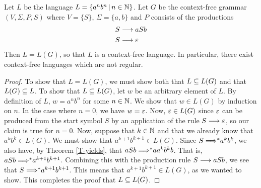 \begin{theorem}
Let $L$ be the language $L=\{a^nb^n\,|\, n\in{\mathbb N}\}$.  Let $G$ be
the context-free grammar $(V,\Sigma,P,S)$ where $V=\{S\}$,
$\Sigma=\{a,b\}$ and $P$ consists of the productions
\begin{align*}
     S&\longrightarrow aSb\\
     S&\longrightarrow \varepsilon 
\end{align*}
Then $L=L(G)$, so that $L$ is a context-free language.  In particular,
there exist context-free languages which are not regular.
\end{theorem}
\begin{proof}
To show that $L=L(G)$, we must show both that $L\subseteq L(G)$
and that $L(G)\subseteq L$.  To show that $L\subseteq L(G)$, let $w$
be an arbitrary element of $L$.  By definition of $L$,
$w=a^nb^n$ for some $n\in{\mathbb N}$.  We show that $w\in L(G)$ by
induction on $n$.  In the case where $n=0$, we have $w=\varepsilon$.
Now, $\varepsilon\in L(G)$ since $\varepsilon$ can be produced
from the start symbol $S$ by an application of the rule $S\longrightarrow\varepsilon$,
so our claim is true for $n=0$.
Now, suppose that $k\in{\mathbb N}$ and that we already know that $a^kb^k\in L(G)$.
We must show that $a^{k+1}b^{k+1}\in L(G)$.  Since 
$S\;{\Longrightarrow}^* a^kb^k$, we also have, by Theorem \ref{T-yields}, that
$aSb\;{\Longrightarrow}^* aa^kb^kb$.
That is, $aSb\;{\Longrightarrow}^* a^{k+1}b^{k+1}$.  Combining this with the
production rule $S\longrightarrow aSb$, we see that $S\;{\Longrightarrow}^* a^{k+1}b^{k+1}$.
This means that $a^{k+1}b^{k+1}\in L(G)$, as we wanted to show.
This completes the proof that $L\subseteq L(G)$.


\end{proof}
